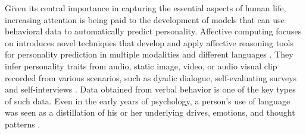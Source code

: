 Given its central importance in capturing the essential aspects of human life, increasing attention is being paid to the development of models that can use behavioral data to automatically predict personality. Affective computing focuses on introduces novel techniques that develop and apply affective reasoning tools for personality prediction in multiple modalities and different languages \cite{el2022deep}. They infer personality traits from audio, static image, video, or audio visual clip recorded from various scenarios, such as dyadic dialogue, self-evaluating surveys and self-interviews \cite{liao2024open}. Data obtained from verbal behavior is one of the key types of such data. Even in the early years of psychology, a person's use of language was seen as a distillation of his or her underlying drives, emotions, and thought patterns \cite{kerz2022pushing}. 

